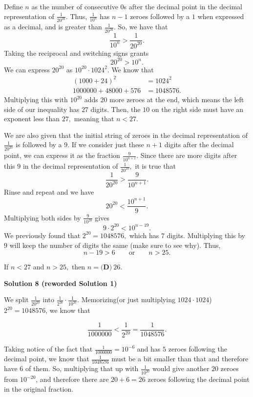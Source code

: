 \begin{enumerate}
Define $n$ as the number of consecutive $0$s after the decimal point in the decimal representation of $\frac{1}{20^{20}}.$ Thus, $\frac{1}{10^n}$ has $n-1$ zeroes followed by a $1$ when expressed as a decimal, and is greater than $\frac{1}{20^{20}}.$ So, we have that
 \[\frac{1}{10^n} > \frac{1}{20^{20}}.\]Taking the reciprocal and switching signs grants
 \[20^{20}>10^n.\]We can express $20^{20}$ as $10^{20} \cdot 1024^2.$ We know that
 \begin{align*}  (1000 + 24)^2 &= 1024^2 \\ 1000000 + 48000 + 576 &= 1048576. \end{align*}
Multiplying this with $10^{20}$ adds $20$ more zeroes at the end, which means the left side of our inequality has $27$ digits. Then, the $10$ on the right side must have an exponent less than $27,$ meaning that $n<27.$

 We are also given that the initial string of zeroes in the decimal representation of $\frac{1}{20^{20}}$ is followed by a $9.$ If we consider just these $n+1$ digits after the decimal point, we can express it as the fraction $\frac{9}{10^{n+1}}.$ Since there are more digits after this $9$ in the decimal representation of $\frac{1}{20^{20}},$ it is true that
 \[\frac{1}{20^{20}} > \frac{9}{10^{n+1}}.\]Rinse and repeat and we have
 \[20^{20} < \frac{10^{n+1}}{9}.\]Multiplying both sides by $\frac{9}{10^{20}}$ gives
 \[9 \cdot 2^{20} < 10^{n-19}.\]We previously found that $2^{20} = 1048576,$ which has $7$ digits. Multiplying this by $9$ will keep the number of digits the same (make sure to see why). Thus, 
 \[n-19>6 \qquad \text{or} \qquad n > 25.\]

 If $n<27$ and $n>25,$ then $n= \boxed{\textbf{(D)} \ 26}.$




\textbf{Solution 8 (reworded Solution 1)}

We split $\frac{1}{20^{20}}$ into $\frac{1}{2^{20}} \cdot \frac{1}{10^{20}}$. Memorizing(or just multiplying $1024 \cdot 1024$) $2^{20} = 1048576$, we know that

 
 \[\frac{1}{1000000} < \frac{1}{2^{20}} = \frac{1}{1048576}.\]

 Taking notice of the fact that $\frac{1}{1000000} = 10^{-6}$ and has $5$ zeroes following the decimal point, we know that $\frac{1}{1048576}$ must be a bit smaller than that and therefore have $6$ of them. So, multiplying that up with $\frac{1}{10^{20}}$ would give another $20$ zeroes from $10^{-20}$, and therefore there are $20 + 6 = \boxed{26}$ zeroes following the decimal point in the original fraction.


\end{enumerate}
